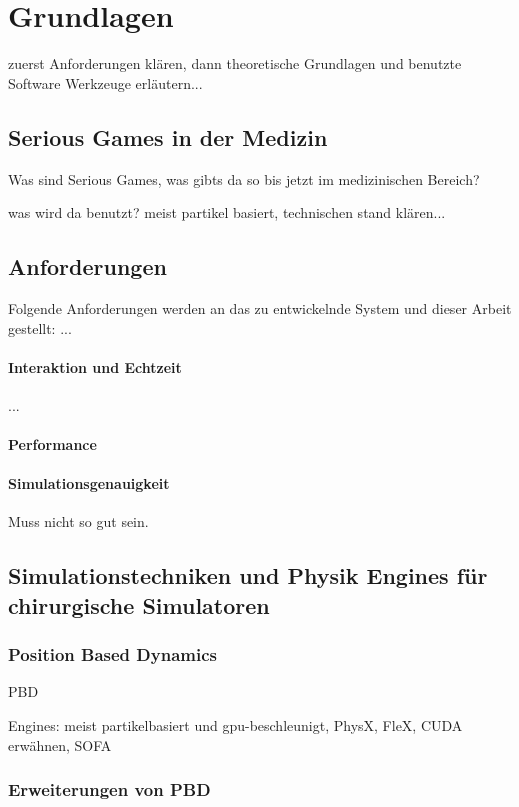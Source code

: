 \chapter{Grundlagen}
zuerst Anforderungen klären, dann theoretische Grundlagen und benutzte Software Werkzeuge erläutern...

\section{Serious Games in der Medizin}
Was sind Serious Games, was gibts da so bis jetzt im medizinischen Bereich?

was wird da benutzt? meist partikel basiert, technischen stand klären...


\section{Anforderungen}
\label{sec_Anforderungen}
Folgende Anforderungen werden an das zu entwickelnde System und dieser Arbeit gestellt: ...

\subsubsection{Interaktion und Echtzeit}
...

\subsubsection{Performance}

\subsubsection{Simulationsgenauigkeit}
Muss nicht so gut sein.

\section{Simulationstechniken und Physik Engines für chirurgische Simulatoren}
\subsection{Position Based Dynamics}
\label{section_PBD}


 \ac{PBD} 

Engines: meist partikelbasiert und gpu-beschleunigt, PhysX, FleX, CUDA erwähnen, SOFA


\subsection{Erweiterungen von PBD}
